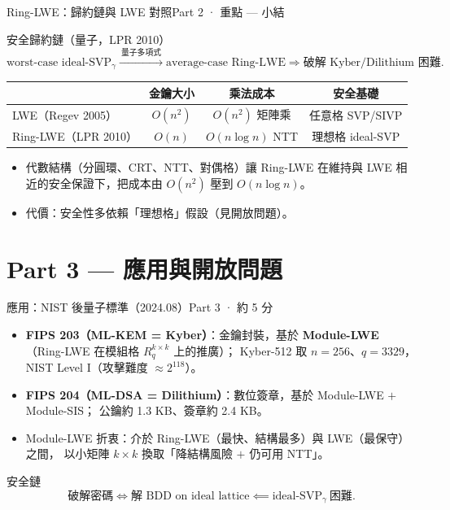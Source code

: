 \documentclass[aspectratio=169, 11pt]{beamer}
\begin{document}
\begin{frame}{Ring-LWE：歸約鏈與 LWE 對照}{Part 2 · 重點 — 小結}
  \begin{block}{安全歸約鏈（量子，LPR 2010）}
    \[
      \text{worst-case ideal-SVP}_\gamma
      \xrightarrow{\ \text{量子多項式}\ }
      \text{average-case Ring-LWE}
      \Longrightarrow
      \text{破解 Kyber/Dilithium 困難}.
    \]
  \end{block}
  \begin{center}\small
  \begin{tabular}{l c c c}
    \hline
    & 金鑰大小 & 乘法成本 & 安全基礎 \\
    \hline
    LWE（Regev 2005） & $O(n^2)$ & $O(n^2)$ 矩陣乘 & 任意格 SVP/SIVP \\
    Ring-LWE（LPR 2010） & $O(n)$ & $O(n\log n)$ NTT & 理想格 ideal-SVP \\
    \hline
  \end{tabular}
  \end{center}
  \vspace{2pt}
  \begin{itemize}\small
    \item 代數結構（分圓環、CRT、NTT、對偶格）讓 Ring-LWE
      \alert{在維持與 LWE 相近的安全保證下，把成本由 $O(n^2)$ 壓到 $O(n\log n)$}。
    \item 代價：安全性多依賴「理想格」假設（見開放問題）。
  \end{itemize}
\end{frame}

\section{Part 3 — 應用與開放問題}

\begin{frame}{應用：NIST 後量子標準（2024.08）}{Part 3 · 約 5 分}
  \begin{itemize}\small
    \item \textbf{FIPS 203（ML-KEM = Kyber）}：金鑰封裝，基於 \textbf{Module-LWE}
      （Ring-LWE 在模組格 $R_q^{k\times k}$ 上的推廣）；
      Kyber-512 取 $n=256$、$q=3329$，NIST Level I（攻擊難度 $\approx2^{118}$）。
    \item \textbf{FIPS 204（ML-DSA = Dilithium）}：數位簽章，基於 Module-LWE $+$ Module-SIS；
      公鑰約 1.3 KB、簽章約 2.4 KB。
    \item Module-LWE 折衷：介於 Ring-LWE（最快、結構最多）與 LWE（最保守）之間，
      以小矩陣 $k\times k$ 換取「降結構風險 $+$ 仍可用 NTT」。
  \end{itemize}
  \begin{block}{安全鏈}
    \[
      \text{破解密碼} \iff \text{解 BDD on ideal lattice} \impliedby \text{ideal-SVP}_\gamma\ \text{困難}.
    \]
  \end{block}
\end{frame}
\end{document}

